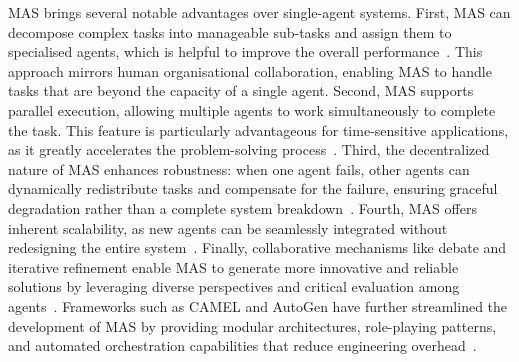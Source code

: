 \documentclass[]{selfevolagent}
\theoremstyle{plain}
\theoremstyle{definition}
\theoremstyle{remark}
\begin{document}
MAS brings several notable advantages over single-agent systems. First, MAS can decompose complex tasks into manageable sub-tasks and assign them to specialised agents, which is helpful to improve the overall performance~\citep{krishnan2025advancing,sarkar2025surveyllmagentcommunication}. This approach mirrors human organisational collaboration, enabling MAS to handle tasks that are beyond the capacity of a single agent. Second, MAS supports parallel execution, allowing multiple agents to work simultaneously to complete the task. This feature is particularly advantageous for time-sensitive applications, as it greatly accelerates the problem-solving process~\citep{zhang-etal-2025-parallelized,liu2025advances,li2025parallelizedplanningactingefficientllmbased}. Third, the decentralized nature of MAS enhances robustness: when one agent fails, other agents can dynamically redistribute tasks and compensate for the failure, ensuring graceful degradation rather than a complete system breakdown~\citep{huang2025resiliencellmbasedmultiagentcollaboration,yang2025agentnetdecentralizedevolutionarycoordination}. Fourth, MAS offers inherent scalability, as new agents can be seamlessly integrated without redesigning the entire system~\citep{han2025llmmultiagentsystemschallenges,chen2024internetagentsweavingweb}. Finally, collaborative mechanisms like debate and iterative refinement enable MAS to generate more innovative and reliable solutions by leveraging diverse perspectives and critical evaluation among agents~\citep{guo2024large,lin2025creativityllmbasedmultiagentsystems}. Frameworks such as CAMEL and AutoGen have further streamlined the development of MAS by providing modular architectures, role-playing patterns, and automated orchestration capabilities that reduce engineering overhead~\citep{li2023camel,wu2024autogen}.
\end{document}
